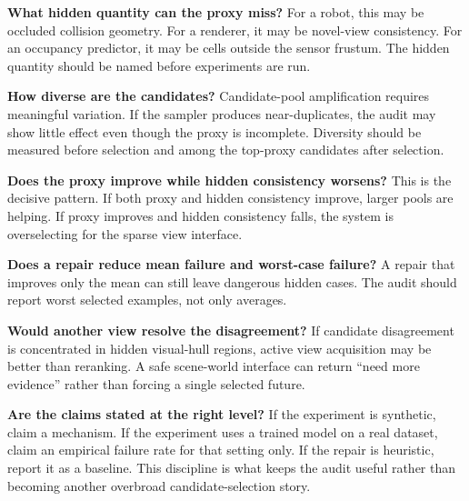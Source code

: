 \documentclass{article}
\begin{document}
\textbf{What hidden quantity can the proxy miss?}
For a robot, this may be occluded collision geometry. For a renderer, it may be
novel-view consistency. For an occupancy predictor, it may be cells outside the
sensor frustum. The hidden quantity should be named before experiments are run.

\textbf{How diverse are the candidates?}
Candidate-pool amplification requires meaningful variation. If the sampler
produces near-duplicates, the audit may show little effect even though the
proxy is incomplete. Diversity should be measured before selection and among
the top-proxy candidates after selection.

\textbf{Does the proxy improve while hidden consistency worsens?}
This is the decisive pattern. If both proxy and hidden consistency improve,
larger pools are helping. If proxy improves and hidden consistency falls, the
system is overselecting for the sparse view interface.

\textbf{Does a repair reduce mean failure and worst-case failure?}
A repair that improves only the mean can still leave dangerous hidden cases.
The audit should report worst selected examples, not only averages.

\textbf{Would another view resolve the disagreement?}
If candidate disagreement is concentrated in hidden visual-hull regions, active
view acquisition may be better than reranking. A safe scene-world interface can
return ``need more evidence'' rather than forcing a single selected future.

\textbf{Are the claims stated at the right level?}
If the experiment is synthetic, claim a mechanism. If the experiment uses a
trained model on a real dataset, claim an empirical failure rate for that
setting only. If the repair is heuristic, report it as a baseline. This
discipline is what keeps the audit useful rather than becoming another
overbroad candidate-selection story.
\end{document}
